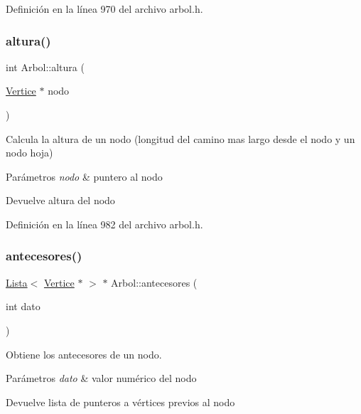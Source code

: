 Definición en la línea 970 del archivo arbol.\+h.

\mbox{\label{classArbol_a9f8928b4c72e2d484ef75cf3633c22ce}} 
\subsubsection{\texorpdfstring{altura()}{altura()}\hspace{0.1cm}{\footnotesize\ttfamily [3/3]}}
{\footnotesize\ttfamily int Arbol\+::altura (\begin{DoxyParamCaption}\item[{\hyperlink{classVertice}{Vertice} $\ast$}]{nodo }\end{DoxyParamCaption})}



Calcula la altura de un nodo (longitud del camino mas largo desde el nodo y un nodo hoja) 


\begin{DoxyParams}{Parámetros}
{\em nodo} & puntero al nodo \\
\hline
\end{DoxyParams}
\begin{DoxyReturn}{Devuelve}
altura del nodo 
\end{DoxyReturn}


Definición en la línea 982 del archivo arbol.\+h.

\mbox{\label{classArbol_ac7ff5e2f436a1e83e24cbdd0b2cc827b}} 
\subsubsection{\texorpdfstring{antecesores()}{antecesores()}\hspace{0.1cm}{\footnotesize\ttfamily [1/2]}}
{\footnotesize\ttfamily \hyperlink{classLista}{Lista}$<$ \hyperlink{classVertice}{Vertice} $\ast$ $>$ $\ast$ Arbol\+::antecesores (\begin{DoxyParamCaption}\item[{int}]{dato }\end{DoxyParamCaption})}



Obtiene los antecesores de un nodo. 


\begin{DoxyParams}{Parámetros}
{\em dato} & valor numérico del nodo \\
\hline
\end{DoxyParams}
\begin{DoxyReturn}{Devuelve}
lista de punteros a vértices previos al nodo 
\end{DoxyReturn}


